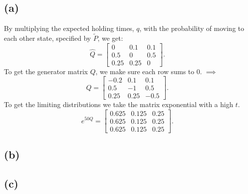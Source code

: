 \documentclass{article}
\begin{document}
\subsection{(a)}
By multiplying the expected holding times, $q$, with the probability of moving to each other state, specified by $\tilde{P}$, we get:
$$ \hat{Q} = \begin{bmatrix}
0 & 0.1 & 0.1\\
0.5 & 0 & 0.5\\
0.25 & 0.25 & 0
\end{bmatrix}.$$
To get the generator matrix $Q$, we make sure each row sums to 0. $\implies$
$$ Q = \begin{bmatrix}
-0.2 & 0.1 & 0.1\\
0.5 & -1 & 0.5\\
0.25 & 0.25 & -0.5
\end{bmatrix}.$$
To get the limiting distributions we take the matrix exponential with a high $t$.
$$ e^{50Q} = \begin{bmatrix}
0.625 & 0.125 & 0.25\\
0.625 & 0.125 & 0.25\\
0.625 & 0.125 & 0.25
\end{bmatrix}.$$

\subsection{(b)}
\subsection{(c)}

\end{document}

